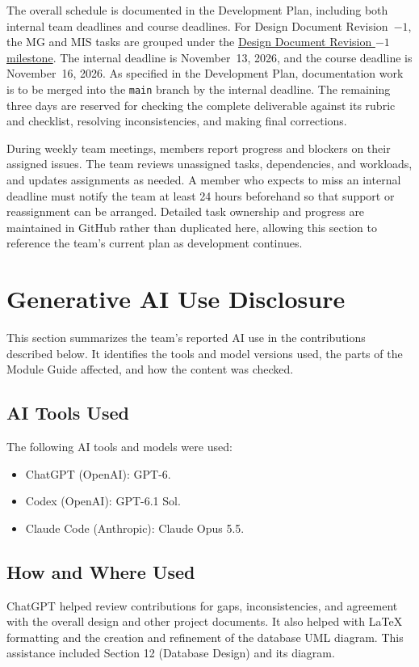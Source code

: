 \documentclass[12pt, titlepage]{article}
\begin{document}
\medskip\noindent
The overall schedule is documented in the Development Plan, including both internal team deadlines and course deadlines. For Design Document Revision~$-1$, the MG and MIS tasks are grouped under the \href{https://github.com/davislenover/BurnNEarn/milestone/7} {Design Document Revision $-1$ milestone}. The internal deadline is November~13, 2026, and the course deadline is November~16, 2026. As specified in the Development Plan, documentation work is to be merged into the \texttt{main} branch by the internal deadline. The remaining three days are reserved for checking the complete deliverable against its rubric and checklist, resolving inconsistencies, and making final corrections.

\medskip\noindent
During weekly team meetings, members report progress and blockers on their assigned issues. The team reviews unassigned tasks, dependencies, and workloads, and updates assignments as needed. A member who expects to miss an internal deadline must notify the team at least 24 hours beforehand so that support or reassignment can be arranged. Detailed task ownership and progress are maintained in GitHub rather than duplicated here, allowing this section to reference the team's current plan as development continues.

\section{Generative AI Use Disclosure}

This section summarizes the team's reported AI use in the contributions described below. It identifies the tools and model versions used, the parts of the Module Guide affected, and how the content was checked.

\subsection{AI Tools Used}

The following AI tools and models were used: 
\begin{itemize}
  \item ChatGPT (OpenAI): GPT-6.
  \item Codex (OpenAI): GPT-6.1 Sol.
  \item Claude Code (Anthropic): Claude Opus 5.5.
\end{itemize}

\subsection{How and Where Used}
ChatGPT helped review contributions for gaps, inconsistencies, and agreement with the overall design and other project documents. It also helped with LaTeX formatting and the creation and refinement of the database UML diagram. This assistance included Section 12 (Database Design) and its diagram. 
\end{document}
